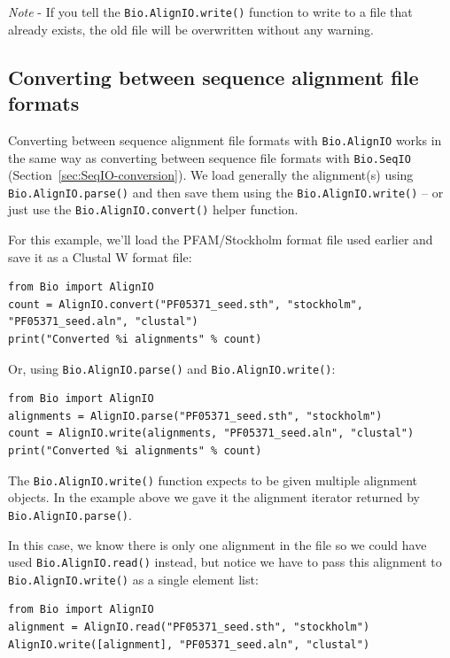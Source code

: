 \documentclass{report}
\begin{document}
\emph{Note} - If you tell the \verb|Bio.AlignIO.write()| function to write to a file that already exists, the old file will be overwritten without any warning.


\subsection{Converting between sequence alignment file formats}
\label{sec:converting-alignments}

Converting between sequence alignment file formats with \verb|Bio.AlignIO| works
in the same way as converting between sequence file formats with \verb|Bio.SeqIO|
(Section~\ref{sec:SeqIO-conversion}). We load generally the alignment(s) using
\verb|Bio.AlignIO.parse()| and then save them using the \verb|Bio.AlignIO.write()|
-- or just use the \verb|Bio.AlignIO.convert()| helper function.

For this example, we'll load the PFAM/Stockholm format file used earlier and save it as a Clustal W format file:

\begin{verbatim}
from Bio import AlignIO
count = AlignIO.convert("PF05371_seed.sth", "stockholm", "PF05371_seed.aln", "clustal")
print("Converted %i alignments" % count)
\end{verbatim}

Or, using \verb|Bio.AlignIO.parse()| and \verb|Bio.AlignIO.write()|:

\begin{verbatim}
from Bio import AlignIO
alignments = AlignIO.parse("PF05371_seed.sth", "stockholm")
count = AlignIO.write(alignments, "PF05371_seed.aln", "clustal")
print("Converted %i alignments" % count)
\end{verbatim}

The \verb|Bio.AlignIO.write()| function expects to be given multiple alignment objects.  In the example above we gave it the alignment iterator returned by \verb|Bio.AlignIO.parse()|.

In this case, we know there is only one alignment in the file so we could have used \verb|Bio.AlignIO.read()| instead, but notice we have to pass this alignment to \verb|Bio.AlignIO.write()| as a single element list:

\begin{verbatim}
from Bio import AlignIO
alignment = AlignIO.read("PF05371_seed.sth", "stockholm")
AlignIO.write([alignment], "PF05371_seed.aln", "clustal")
\end{verbatim}
\end{document}
